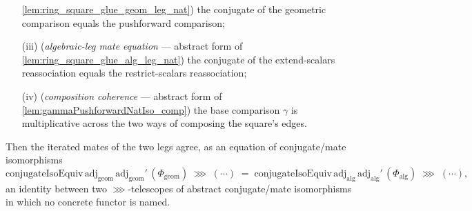 \begin{lemma}
\begin{enumerate}
      \cref{lem:ring_square_glue_geom_leg_nat}) the conjugate of the geometric comparison equals the
      pushforward comparison;
    \item[(iii)] (\emph{algebraic-leg mate equation} --- abstract form of
      \cref{lem:ring_square_glue_alg_leg_nat}) the conjugate of the extend-scalars reassociation equals
      the restrict-scalars reassociation;
    \item[(iv)] (\emph{composition coherence} --- abstract form of
      \cref{lem:gammaPushforwardNatIso_comp}) the base comparison \(\gamma\) is multiplicative across
      the two ways of composing the square's edges.
  \end{enumerate}
  Then the iterated mates of the two legs agree, as an equation of conjugate/mate isomorphisms
  \[
    \mathrm{conjugateIsoEquiv}\,\mathrm{adj}_{\mathrm{geom}}\,\mathrm{adj}_{\mathrm{geom}}'\,
      (\Phi_{\mathrm{geom}})
      \;\ggg\;
      (\cdots)
      \;=\;
    \mathrm{conjugateIsoEquiv}\,\mathrm{adj}_{\mathrm{alg}}\,\mathrm{adj}_{\mathrm{alg}}'\,
      (\Phi_{\mathrm{alg}})
      \;\ggg\;
      (\cdots),
  \]
  an identity between two \(\ggg\)-telescopes of abstract conjugate/mate isomorphisms in which no
  concrete functor is named.


\end{lemma}
